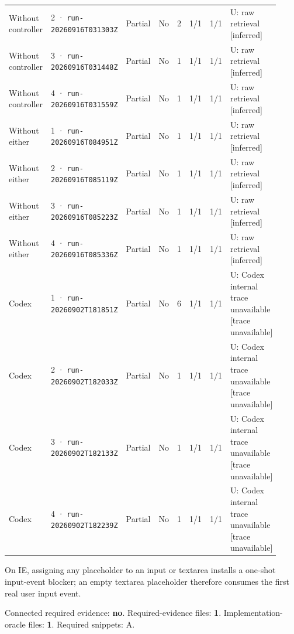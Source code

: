 \begin{landscape}
\begin{longtable}{@{}L{0.11\linewidth}L{0.16\linewidth}*{1}{L{0.022\linewidth}}L{0.05\linewidth}L{0.045\linewidth}L{0.08\linewidth}L{0.085\linewidth}L{0.368\linewidth}@{}}
Without controller & 2 · \texttt{run-20260916\allowbreak T031303Z} & Partial & No & 2 & 1/1 & 1/1 & U: raw retrieval [inferred] \\
Without controller & 3 · \texttt{run-20260916\allowbreak T031448Z} & Partial & No & 1 & 1/1 & 1/1 & U: raw retrieval [inferred] \\
Without controller & 4 · \texttt{run-20260916\allowbreak T031559Z} & Partial & No & 1 & 1/1 & 1/1 & U: raw retrieval [inferred] \\
Without either & 1 · \texttt{run-20260916\allowbreak T084951Z} & Partial & No & 1 & 1/1 & 1/1 & U: raw retrieval [inferred] \\
Without either & 2 · \texttt{run-20260916\allowbreak T085119Z} & Partial & No & 1 & 1/1 & 1/1 & U: raw retrieval [inferred] \\
Without either & 3 · \texttt{run-20260916\allowbreak T085223Z} & Partial & No & 1 & 1/1 & 1/1 & U: raw retrieval [inferred] \\
Without either & 4 · \texttt{run-20260916\allowbreak T085336Z} & Partial & No & 1 & 1/1 & 1/1 & U: raw retrieval [inferred] \\
Codex & 1 · \texttt{run-20260902\allowbreak T181851Z} & Partial & No & 6 & 1/1 & 1/1 & U: Codex internal trace unavailable [trace unavailable] \\
Codex & 2 · \texttt{run-20260902\allowbreak T182033Z} & Partial & No & 1 & 1/1 & 1/1 & U: Codex internal trace unavailable [trace unavailable] \\
Codex & 3 · \texttt{run-20260902\allowbreak T182133Z} & Partial & No & 1 & 1/1 & 1/1 & U: Codex internal trace unavailable [trace unavailable] \\
Codex & 4 · \texttt{run-20260902\allowbreak T182239Z} & Partial & No & 1 & 1/1 & 1/1 & U: Codex internal trace unavailable [trace unavailable] \\
\end{longtable}
\endgroup
\end{landscape}

\label{sec:vuejs-vue-9042}

On IE, assigning any placeholder to an input or textarea installs a one-shot input-event blocker; an empty textarea placeholder therefore consumes the first real user input event.

Connected required evidence: \textbf{no}. Required-evidence files: \textbf{1}. Implementation-oracle files: \textbf{1}. Required snippets: A.


